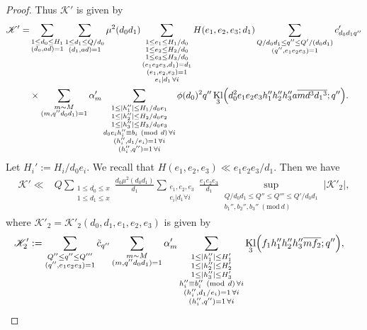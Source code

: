 \documentclass[10pt]{amsart}
\theoremstyle{plain}
\numberwithin{equation}{section}
\DeclareMathOperator{\Kl}{Kl}
\newcommand{\Mod}[1]{\ (\mathrm{mod}\ #1)}
\begin{document}
\begin{proof}
Thus $\mathscr{K}'$ is given by
\begin{align*}
\mathscr{K}'=&\sum_{\substack{1\le d_0\le H_1\\ (d_0,ad)=1}}\sum_{\substack{1\le d_1\le Q/d_0\\ (d_1,ad)=1}}\mu^2(d_0 d_1)\sum_{\substack{1\le e_1\le H_1/d_0\\ 1\le e_2\le H_2/d_0\\ 1\le e_3\le H_3/d_0\\ (e_1e_2e_3,d_1)=d_1\\ (e_1,e_2,e_3)=1\\ e_i|d_1\,\forall i}}H(e_1,e_2,e_3;d_1)\sum_{\substack{Q/d_0d_1\le q''\le Q'/(d_0d_1)\\ (q'',e_1e_2e_3)=1}}c'_{d_0 d_1 q''}\\
&\times\sum_{\substack{m\sim M\\ (m,q'' d_0d_1)=1}}\alpha'_m\sum_{\substack{1\le |h_1''|\le H_1/d_0e_1\\ 1\le |h_2''|\le H_2/d_0e_2 \\ 1\le |h_3''|\le H_3/d_0e_3\\ d_0 e_i h_i''\equiv b_i\Mod{d}\,\forall i\\  (h_i'',d_1/e_i)=1\,\forall i\\ (h_i'',q'')=1\,\forall i}}\phi(d_0)^2q'' \Kl_3\Bigl(d_0^2e_1e_2e_3h_1''h_2''h_3''a\overline{m d^3 d_1{}^3};q''\Bigr).
\end{align*}
Let $H_i':=H_i/d_0e_i$. We recall that $H(e_1,e_2,e_3)\ll e_1e_2e_3/d_1$. Then we have
\begin{align*}
\mathscr{K}'\ll & Q\sum_{\substack{1\le d_0\le x\\ 1\le d_1\le x}}\frac{d_0\mu^2(d_0 d_1)}{d_1}\sum_{\substack{e_1,e_2,e_3 \\ e_i|d_1 \forall i}}\frac{e_1 e_2 e_3}{d_1}\sup_{\substack{Q/d_0d_1\le Q''\le Q'''\le Q'/d_0d_1\\ b_1'',b_2'',b_3''\Mod{d}}}|\mathscr{K}'_2|,
\end{align*}
where $\mathscr{K}'_2=\mathscr{K}'_2(d_0,d_1,e_1,e_2,e_3)$ is given by
\begin{align*}
\mathscr{K}'_2&:=\sum_{\substack{Q''\le q''\le Q'''\\ (q'',e_1e_2e_3)=1}}\tilde{c}_{q''}\sum_{\substack{m\sim M\\ (m,q''d_0d_1)=1}}\alpha'_m\sum_{\substack{1\le |h_1''|\le H_1'\\ 1\le |h_2''|\le H_2' \\ 1\le |h_3''|\le H_3'\\ h_i''\equiv b_i''\Mod{d}\,\forall i\\ (h_i'',d_1/e_i)=1\,\forall i\\ (h_i'',q'')=1\,\forall i}}\Kl_3\Bigl(f_1 h_1''h_2''h_3''\overline{m f_2};q''\Bigr),

\end{align*}
\end{proof}
\end{document}
